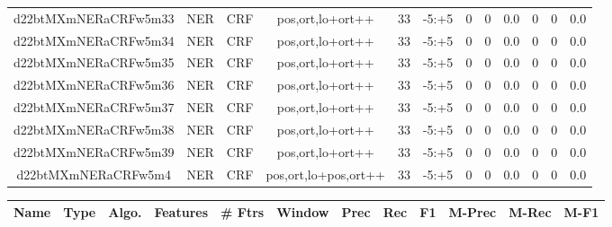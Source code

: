 \documentclass[a4paper]{article}
\begin{document}
\begin{landscape}
\begin{center}
\begin{tabular}{ |c|c|c|c|c|c|c|c|c|c|c|c|}
 
 	
 	\small{ d22btMXmNERaCRFw5m33 } & \small{ NER} & \small{  CRF }  & pos,ort,lo+ort++  &  33 &  \small{  -5:+5 }  &  0 & 0 & 0.0  &  0 & 0 & 0.0 \\
 	

 
 	
 	\small{ d22btMXmNERaCRFw5m34 } & \small{ NER} & \small{  CRF }  & pos,ort,lo+ort++  &  33 &  \small{  -5:+5 }  &  0 & 0 & 0.0  &  0 & 0 & 0.0 \\
 	

 
 	
 	\small{ d22btMXmNERaCRFw5m35 } & \small{ NER} & \small{  CRF }  & pos,ort,lo+ort++  &  33 &  \small{  -5:+5 }  &  0 & 0 & 0.0  &  0 & 0 & 0.0 \\
 	

 
 	
 	\small{ d22btMXmNERaCRFw5m36 } & \small{ NER} & \small{  CRF }  & pos,ort,lo+ort++  &  33 &  \small{  -5:+5 }  &  0 & 0 & 0.0  &  0 & 0 & 0.0 \\
 	

 
 	
 	\small{ d22btMXmNERaCRFw5m37 } & \small{ NER} & \small{  CRF }  & pos,ort,lo+ort++  &  33 &  \small{  -5:+5 }  &  0 & 0 & 0.0  &  0 & 0 & 0.0 \\
 	

 
 	
 	\small{ d22btMXmNERaCRFw5m38 } & \small{ NER} & \small{  CRF }  & pos,ort,lo+ort++  &  33 &  \small{  -5:+5 }  &  0 & 0 & 0.0  &  0 & 0 & 0.0 \\
 	

 
 	
 	\small{ d22btMXmNERaCRFw5m39 } & \small{ NER} & \small{  CRF }  & pos,ort,lo+ort++  &  33 &  \small{  -5:+5 }  &  0 & 0 & 0.0  &  0 & 0 & 0.0 \\
 	

 
 	
 	\small{ d22btMXmNERaCRFw5m4 } & \small{ NER} & \small{  CRF }  & pos,ort,lo+pos,ort++  &  33 &  \small{  -5:+5 }  &  0 & 0 & 0.0  &  0 & 0 & 0.0 \\
 	
 \hline
\end{tabular}
\end{center}




\begin{center}
\begin{tabular}{ |c|c|c|c|c|c|c|c|c|c|c|c|} 
 \hline
 	Name & Type & Algo. & Features & \# Ftrs & Window & Prec & Rec & F1 & M-Prec & M-Rec & M-F1\\
 \hline


\end{tabular}
\end{center}
\end{landscape}
\end{document}
